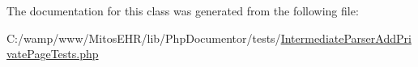 \-The documentation for this class was generated from the following file\-:\begin{DoxyCompactItemize}
\item 
\-C\-:/wamp/www/\-Mitos\-E\-H\-R/lib/\-Php\-Documentor/tests/\hyperlink{_intermediate_parser_add_private_page_tests_8php}{\-Intermediate\-Parser\-Add\-Private\-Page\-Tests.\-php}\end{DoxyCompactItemize}
